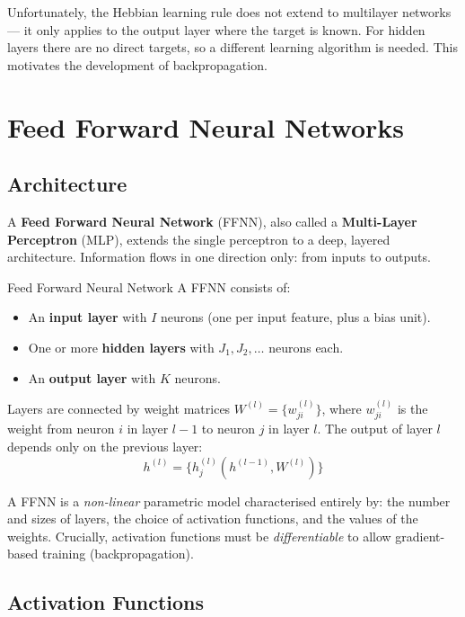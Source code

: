 \documentclass[11pt,a4paper]{article}
\newcommand{\term}[1]{\textcolor{DefGreen}{\textbf{#1}}}
\begin{document}
Unfortunately, the Hebbian learning rule does not extend to multilayer networks — it only applies to the output layer where the target is known. For hidden layers there are no direct targets, so a different learning algorithm is needed. This motivates the development of backpropagation.

\section{Feed Forward Neural Networks}

\subsection{Architecture}

A \term{Feed Forward Neural Network} (FFNN), also called a \term{Multi-Layer Perceptron} (MLP), extends the single perceptron to a deep, layered architecture. Information flows in one direction only: from inputs to outputs.

\begin{defbox}{Feed Forward Neural Network}
A FFNN consists of:
\begin{itemize}
  \item An \textbf{input layer} with $I$ neurons (one per input feature, plus a bias unit).
  \item One or more \textbf{hidden layers} with $J_1, J_2, \ldots$ neurons each.
  \item An \textbf{output layer} with $K$ neurons.
\end{itemize}
Layers are connected by weight matrices $W^{(l)} = \{w_{ji}^{(l)}\}$, where $w_{ji}^{(l)}$ is the weight from neuron $i$ in layer $l-1$ to neuron $j$ in layer $l$. The output of layer $l$ depends only on the previous layer:
\[
h^{(l)} = \bigl\{h_j^{(l)}(h^{(l-1)}, W^{(l)})\bigr\}
\]
\end{defbox}

A FFNN is a \emph{non-linear} parametric model characterised entirely by: the number and sizes of layers, the choice of activation functions, and the values of the weights. Crucially, activation functions must be \emph{differentiable} to allow gradient-based training (backpropagation).

\subsection{Activation Functions}
\end{document}
